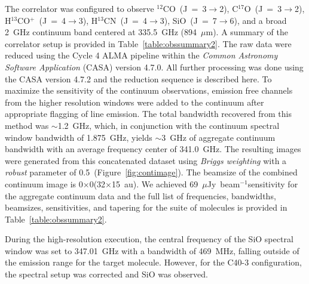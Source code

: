 \documentclass[twocolumn, 12pt]{aastex63}
\newcommand{\htcn}{H$^{13}$CN}
\newcommand{\cso}{C$^{17}$O}
\newcommand{\htcop}{H$^{13}$CO$^+$}
\newcommand{\co}{$^{12}$CO}
\newcommand{\sio}{SiO}
\newcommand{\lco}{\co~(J~=~3$\rightarrow$2)}
\newcommand{\lhtcn}{\htcn~(J~=~4$\rightarrow$3)}
\newcommand{\lcso}{\cso~(J~=~3$\rightarrow$2)}
\newcommand{\lhtcop}{\htcop~(J~=~4$\rightarrow$3)}
\newcommand{\lsio}{\sio~(J~=~7$\rightarrow$6)}
\renewcommand{\micron}{$\mu$m}
\newcommand{\ab}{$\sim$}
\newcommand{\contbeam}{0\farcs11$\times$0\farcs05}
\begin{document}
The  correlator was configured to observe \lco, \lcso, \lhtcop, \lhtcn, \lsio, and a broad 2~GHz continuum band centered at 335.5~GHz (894~\micron). A summary of the correlator setup is provided in Table~\ref{table:obssummary2}. The raw data were reduced using the Cycle 4 ALMA pipeline within the \textit{Common Astronomy Software Application} (CASA) \citep{2007ASPC..376..127M} version 4.7.0. All further processing was done using the CASA version 4.7.2 and the reduction sequence is described here. To maximize the sensitivity of the continuum observations, emission free channels from the higher resolution windows were added to the continuum after appropriate flagging of line emission. The total bandwidth recovered from this method was \ab1.2~GHz, which, in conjunction with the continuum spectral window bandwidth of 1.875~GHz, yields \ab3~GHz of aggregate continuum bandwidth with an average frequency center of 341.0~GHz.
The resulting images were generated from this concatenated dataset using \textit{Briggs weighting} with a \textit{robust} parameter of 0.5~(Figure~\ref{fig:contimage}). The beamsize of the combined continuum image is \contbeam\space (32$\times$15~au). We achieved 69~$\mu$Jy~beam$^{-1}$\space sensitivity for the aggregate continuum data and the full list of frequencies, bandwidths, beamsizes, sensitivities, and tapering for the suite of molecules is provided in Table~\ref{table:obssummary2}.

During the high-resolution execution, the central frequency of the SiO spectral window was set to 347.01~GHz with a bandwidth of 469~MHz, falling outside of the emission range for the target molecule. However, for the C40-3 configuration, the spectral setup was corrected and SiO was observed.
\end{document}
